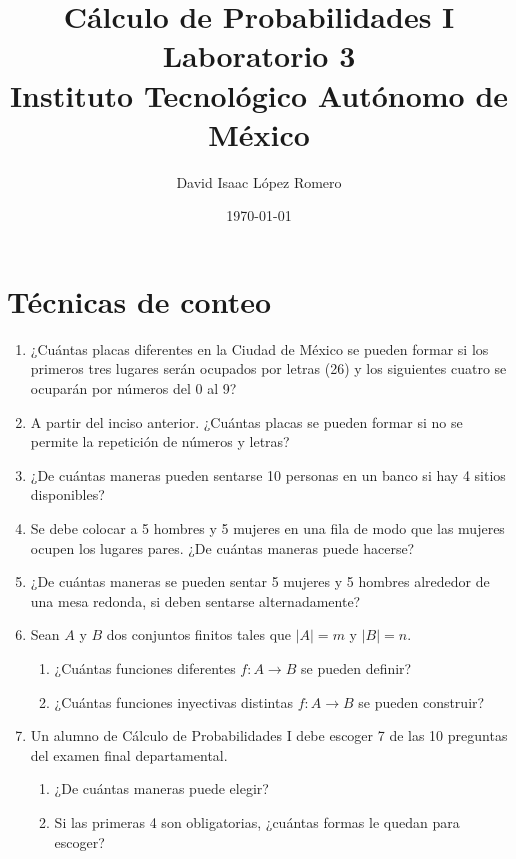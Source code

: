 \documentclass[10pt,a4paper]{article}
\title{Cálculo de Probabilidades I \\
	\large Laboratorio 3\\ Instituto Tecnológico Autónomo de México}
\author{David Isaac López Romero}
\date{\today}
\begin{document}
\maketitle


\section{Técnicas de conteo}
	
	
	\begin{enumerate}
	
		\item ¿Cuántas placas diferentes en la Ciudad de México se pueden formar si los primeros tres lugares serán ocupados por letras (26) y los siguientes cuatro se ocuparán por números del 0 al 9?
		
		\item A partir del inciso anterior. ¿Cuántas placas se pueden formar si no se permite la repetición de números y letras?
		
		\item ¿De cuántas maneras pueden sentarse 10 personas en un banco si hay 4 sitios disponibles?
		
		\item Se debe colocar a 5 hombres y 5 mujeres en una fila de modo que las mujeres ocupen los lugares pares. ¿De cuántas maneras puede hacerse?
		
		\item ¿De cuántas maneras se pueden sentar 5 mujeres y 5 hombres alrededor de una mesa redonda, si deben sentarse alternadamente?
		
		\item Sean $A$ y $B$ dos conjuntos finitos tales que $|A|=m$ y $|B|=n$.
		\begin{enumerate}
			\item ¿Cuántas funciones diferentes $f:A \rightarrow B$ se pueden definir?
			\item ¿Cuántas funciones inyectivas distintas $f:A \rightarrow B$ se pueden construir?
		\end{enumerate}
	
		\item Un alumno de Cálculo de Probabilidades I debe escoger 7 de las 10 preguntas del examen final departamental.
		\begin{enumerate}
			\item ¿De cuántas maneras puede elegir?
			\item Si las primeras 4 son obligatorias, ¿cuántas formas le quedan para escoger?
		\end{enumerate}
	

\end{enumerate}
\end{document}
